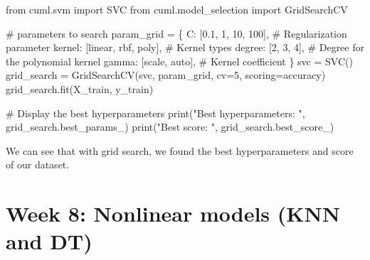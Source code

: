 \documentclass[
  letterpaper,
  DIV=11,
  numbers=noendperiod]{scrartcl}
\newenvironment{Shaded}{\begin{snugshade}}{\end{snugshade}}
\newcommand{\BuiltInTok}[1]{\textcolor[rgb]{0.00,0.23,0.31}{#1}}
\newcommand{\CommentTok}[1]{\textcolor[rgb]{0.37,0.37,0.37}{#1}}
\newcommand{\DecValTok}[1]{\textcolor[rgb]{0.68,0.00,0.00}{#1}}
\newcommand{\FloatTok}[1]{\textcolor[rgb]{0.68,0.00,0.00}{#1}}
\newcommand{\ImportTok}[1]{\textcolor[rgb]{0.00,0.46,0.62}{#1}}
\newcommand{\NormalTok}[1]{\textcolor[rgb]{0.00,0.23,0.31}{#1}}
\newcommand{\OperatorTok}[1]{\textcolor[rgb]{0.37,0.37,0.37}{#1}}
\newcommand{\StringTok}[1]{\textcolor[rgb]{0.13,0.47,0.30}{#1}}
\begin{document}
\begin{Shaded}
\begin{Highlighting}[]
\ImportTok{from}\NormalTok{ cuml.svm }\ImportTok{import}\NormalTok{ SVC}
\ImportTok{from}\NormalTok{ cuml.model\_selection }\ImportTok{import}\NormalTok{ GridSearchCV}

\CommentTok{\# parameters to search}
\NormalTok{param\_grid }\OperatorTok{=}\NormalTok{ \{}
    \StringTok{\textquotesingle{}C\textquotesingle{}}\NormalTok{: [}\FloatTok{0.1}\NormalTok{, }\DecValTok{1}\NormalTok{, }\DecValTok{10}\NormalTok{, }\DecValTok{100}\NormalTok{],          }\CommentTok{\# Regularization parameter}
    \StringTok{\textquotesingle{}kernel\textquotesingle{}}\NormalTok{: [}\StringTok{\textquotesingle{}linear\textquotesingle{}}\NormalTok{, }\StringTok{\textquotesingle{}rbf\textquotesingle{}}\NormalTok{, }\StringTok{\textquotesingle{}poly\textquotesingle{}}\NormalTok{],  }\CommentTok{\# Kernel types}
    \StringTok{\textquotesingle{}degree\textquotesingle{}}\NormalTok{: [}\DecValTok{2}\NormalTok{, }\DecValTok{3}\NormalTok{, }\DecValTok{4}\NormalTok{],             }\CommentTok{\# Degree for the polynomial kernel}
    \StringTok{\textquotesingle{}gamma\textquotesingle{}}\NormalTok{: [}\StringTok{\textquotesingle{}scale\textquotesingle{}}\NormalTok{, }\StringTok{\textquotesingle{}auto\textquotesingle{}}\NormalTok{],      }\CommentTok{\# Kernel coefficient}
\NormalTok{\}}
\NormalTok{svc }\OperatorTok{=}\NormalTok{ SVC()}
\NormalTok{grid\_search }\OperatorTok{=}\NormalTok{ GridSearchCV(svc, param\_grid, cv}\OperatorTok{=}\DecValTok{5}\NormalTok{, scoring}\OperatorTok{=}\StringTok{\textquotesingle{}accuracy\textquotesingle{}}\NormalTok{)}
\NormalTok{grid\_search.fit(X\_train, y\_train)}

\CommentTok{\# Display the best hyperparameters}
\BuiltInTok{print}\NormalTok{(}\StringTok{"Best hyperparameters: "}\NormalTok{, grid\_search.best\_params\_)}
\BuiltInTok{print}\NormalTok{(}\StringTok{"Best score: "}\NormalTok{, grid\_search.best\_score\_)}
\end{Highlighting}
\end{Shaded}

We can see that with grid search, we found the best hyperparameters and
score of our dataset.

\section{Week 8: Nonlinear models (KNN and
DT)}\label{week-8-nonlinear-models-knn-and-dt}
\end{document}

